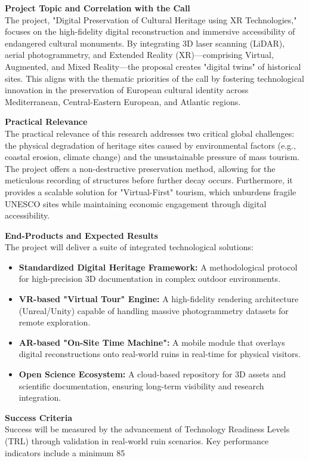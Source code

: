 \textbf{Project Topic and Correlation with the Call}\\
The project, "Digital Preservation of Cultural Heritage using XR Technologies," focuses on the high-fidelity digital reconstruction and immersive accessibility of endangered cultural monuments. By integrating 3D laser scanning (LiDAR), aerial photogrammetry, and Extended Reality (XR)—comprising Virtual, Augmented, and Mixed Reality—the proposal creates "digital twins" of historical sites. This aligns with the thematic priorities of the call by fostering technological innovation in the preservation of European cultural identity across Mediterranean, Central-Eastern European, and Atlantic regions.

\medskip
\textbf{Practical Relevance}\\
The practical relevance of this research addresses two critical global challenges: the physical degradation of heritage sites caused by environmental factors (e.g., coastal erosion, climate change) and the unsustainable pressure of mass tourism. The project offers a non-destructive preservation method, allowing for the meticulous recording of structures before further decay occurs. Furthermore, it provides a scalable solution for "Virtual-First" tourism, which unburdens fragile UNESCO sites while maintaining economic engagement through digital accessibility.

\medskip
\textbf{End-Products and Expected Results}\\
The project will deliver a suite of integrated technological solutions:
\begin{itemize}
    \item \textbf{Standardized Digital Heritage Framework:} 
    A methodological protocol for high-precision 3D documentation in complex outdoor environments.
    \item \textbf{VR-based "Virtual Tour" Engine:}
    A high-fidelity rendering architecture (Unreal/Unity) capable of handling massive photogrammetry datasets for remote exploration.
    \item \textbf{AR-based "On-Site Time Machine":}
    A mobile module that overlays digital reconstructions onto real-world ruins in real-time for physical visitors.
    \item \textbf{Open Science Ecosystem:}
    A cloud-based repository for 3D assets and scientific documentation, ensuring long-term visibility and research integration.
\end{itemize}

\medskip
\textbf{Success Criteria}\\
Success will be measured by the advancement of Technology Readiness Levels (TRL) through validation in real-world ruin scenarios. Key performance indicators include a minimum 85%
